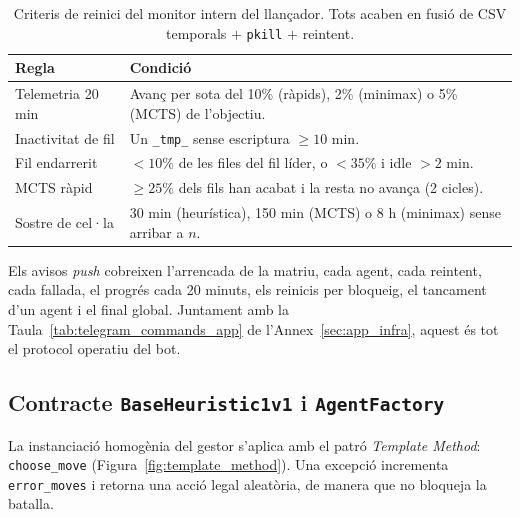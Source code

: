 \begin{table}[htbp]
    \centering
    \caption{Criteris de reinici del monitor intern del llançador. Tots acaben en fusió de CSV temporals $+$ \texttt{pkill} $+$ reintent.}
    \label{tab:launcher_stall}
    \small
    \renewcommand{\arraystretch}{1.15}
    \begin{tabularx}{\textwidth}{lX}
        \toprule
        \textbf{Regla} & \textbf{Condició} \\
        \midrule
        Telemetria 20 min & Avanç per sota del 10\% (ràpids), 2\% (minimax) o 5\% (MCTS) de l'objectiu. \\
        \arrayrulecolor{gray!30}\hline\arrayrulecolor{black}
        Inactivitat de fil & Un \texttt{\_tmp\_} sense escriptura $\ge 10$ min. \\
        \arrayrulecolor{gray!30}\hline\arrayrulecolor{black}
        Fil endarrerit & $<10\%$ de les files del fil líder, o $<35\%$ i idle $>2$ min. \\
        \arrayrulecolor{gray!30}\hline\arrayrulecolor{black}
        MCTS ràpid & $\ge 25\%$ dels fils han acabat i la resta no avança (2 cicles). \\
        \arrayrulecolor{gray!30}\hline\arrayrulecolor{black}
        Sostre de cel·la & 30 min (heurística), 150 min (MCTS) o 8 h (minimax) sense arribar a $n$. \\
        \bottomrule
    \end{tabularx}
\end{table}

Els avisos \emph{push} cobreixen l'arrencada de la matriu, cada agent, cada reintent, cada fallada, el progrés cada 20 minuts, els reinicis per bloqueig, el tancament d'un agent i el final global. Juntament amb la Taula~\ref{tab:telegram_commands_app} de l'Annex~\ref{sec:app_infra}, aquest és tot el protocol operatiu del bot.

\subsection{Contracte \texttt{BaseHeuristic1v1} i \texttt{AgentFactory}}

La instanciació homogènia del gestor s'aplica amb el patró \textit{Template Method}: \texttt{choose\_move} (Figura~\ref{fig:template_method}). Una excepció incrementa \texttt{error\_moves} i retorna una acció legal aleatòria, de manera que no bloqueja la batalla.

